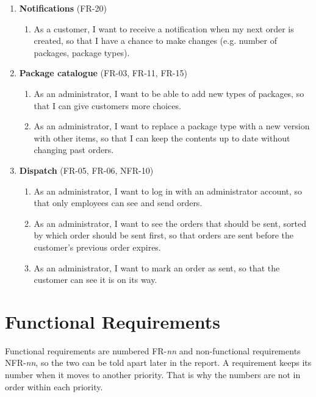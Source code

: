 \documentclass[a4paper,11pt]{article}
\begin{document}
\begin{enumerate}
    \item \textbf{Notifications} (FR-20)
    \begin{enumerate}
        \item As a customer, I want to receive a notification when my next order is created, so that I have a chance to make changes (e.g. number of packages, package types).
    \end{enumerate}

    \item \textbf{Package catalogue} (FR-03, FR-11, FR-15)
    \begin{enumerate}
        \item As an administrator, I want to be able to add new types of packages, so that I can give customers more choices.
        \item As an administrator, I want to replace a package type with a new version with other items, so that I can keep the contents up to date without changing past orders.
    \end{enumerate}

    \item \textbf{Dispatch} (FR-05, FR-06, NFR-10)
    \begin{enumerate}
        \item As an administrator, I want to log in with an administrator account, so that only employees can see and send orders.
        \item As an administrator, I want to see the orders that should be sent, sorted by which order should be sent first, so that orders are sent before the customer's previous order expires.
        \item As an administrator, I want to mark an order as sent, so that the customer can see it is on its way.
    \end{enumerate}
\end{enumerate}

\section{Functional Requirements}
\label{sec:fr}
Functional requirements are numbered FR-\emph{nn} and non-functional requirements NFR-\emph{nn}, so the two can be told apart later in the report. A requirement keeps its number when it moves to another priority. That is why the numbers are not in order within each priority.
\end{document}
